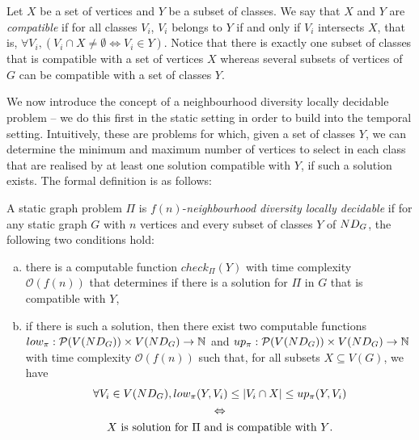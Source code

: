 %
Let $X$ be a set of vertices and $Y$ be a subset of classes. We say that $X$ and $Y$ are \emph{compatible} if for all classes $V_i$, $V_i$ belongs to $Y$ if and only if $V_i$ intersects $X$, that is, $\forall V_i, (V_i \cap X \neq \emptyset \Leftrightarrow V_i \in Y)$.
Notice that there is exactly one subset of classes that is compatible with a set of vertices $X$ whereas several subsets of vertices of $G$ can be compatible with a set of classes $Y$.
%

We now introduce the concept of a neighbourhood diversity locally decidable problem -- we do this first in the static setting in order to build into the temporal setting. 
Intuitively, these are problems for which, given a set of classes $Y$, we can determine the minimum and maximum number of vertices to select in each class that are realised by at least one solution compatible with $Y$, if such a solution exists. The formal definition is as follows:

\begin{definition}
  \label{def:ndld}
  A static graph problem $\Pi$ is $f(n)$-\emph{neighbourhood diversity locally decidable} if
  for any static graph $G$ with $n$ vertices and every subset of classes $Y$ of $\ndg[G]$, the following two conditions hold:
  \begin{enumerate}[(a)]
    \item there is a computable function $check_\Pi(Y)$ with time complexity $\mathcal{O}(f(n))$ that determines if there is a solution for $\Pi$ in $G$ that is compatible with $Y$,
    \item if there is such a solution, then
      there exist two computable functions \\$low_\pi : \mathcal{P}(V(\ndg[G])) \times V(\ndg[G]) \to \mathbb{N}$ and $up_\pi : \mathcal{P}(V(\ndg[G])) \times  V(\ndg[G]) \to \mathbb{N}$ with time complexity $\mathcal{O}(f(n))$ such that, for all subsets $X \subseteq V(G)$, we have
\begin{gather*}
  \forall V_i \in V(\ndg[G]), low_\pi(Y,V_i) \leq |V_i \cap X| \leq up_\pi(Y,V_i)\\
  \Leftrightarrow \\
  \text{$X$ is solution for $\Pi$ and is compatible with $Y$}. 
\end{gather*}
  \end{enumerate}
\end{definition}

